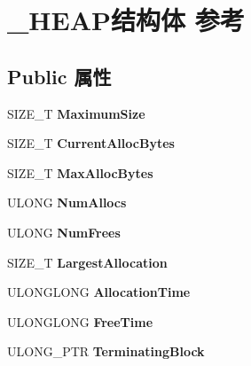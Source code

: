 \hypertarget{struct___h_e_a_p}{}\section{\+\_\+\+H\+E\+A\+P结构体 参考}
\label{struct___h_e_a_p}
\subsection*{Public 属性}
\begin{DoxyCompactItemize}
\item 
\mbox{\label{struct___h_e_a_p_ae03f778a9b9a3845a872e581d8456ff0}} 
S\+I\+Z\+E\+\_\+T {\bfseries Maximum\+Size}
\item 
\mbox{\label{struct___h_e_a_p_a1206282941908d9a3e373cc940b43406}} 
S\+I\+Z\+E\+\_\+T {\bfseries Current\+Alloc\+Bytes}
\item 
\mbox{\label{struct___h_e_a_p_ad1ae8bd53aba2fa7ab4d42301862a9bc}} 
S\+I\+Z\+E\+\_\+T {\bfseries Max\+Alloc\+Bytes}
\item 
\mbox{\label{struct___h_e_a_p_ae49956a90fe7c083953c77196484b131}} 
U\+L\+O\+NG {\bfseries Num\+Allocs}
\item 
\mbox{\label{struct___h_e_a_p_aec80aa50224f0a07fc4ab6046634c8fb}} 
U\+L\+O\+NG {\bfseries Num\+Frees}
\item 
\mbox{\label{struct___h_e_a_p_a03132a703f86cfd5dd1a88a97a20cca6}} 
S\+I\+Z\+E\+\_\+T {\bfseries Largest\+Allocation}
\item 
\mbox{\label{struct___h_e_a_p_ae766f5b856e23fcfdb5b3848a65857b1}} 
U\+L\+O\+N\+G\+L\+O\+NG {\bfseries Allocation\+Time}
\item 
\mbox{\label{struct___h_e_a_p_a814604b38d0e31ecc3c634309a8b6d38}} 
U\+L\+O\+N\+G\+L\+O\+NG {\bfseries Free\+Time}
\item 
\mbox{\label{struct___h_e_a_p_a09610f5ed95ab6cd909d40a22ccbefe6}} 
U\+L\+O\+N\+G\+\_\+\+P\+TR {\bfseries Terminating\+Block}
\item 

\end{DoxyCompactItemize}
